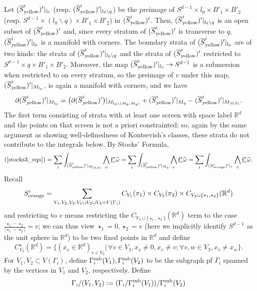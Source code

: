\documentclass[11pt]{article}
\theoremstyle{definition}
\theoremstyle{remark}
\def\wt#1{\widetilde{#1}}
\def\ov#1{\overline{#1}}
\def\syellow{{\textnormal{yellow}}}
\def\sorange{{\textnormal{orange}}}
\def\R{\mathbb{R}}
\def\ff{\mathfrak{f}}
\def\tn#1{\textnormal{#1}}
\begin{document}
Let $(\ov{S}_{\syellow}^i)'|_{l_0}$ (resp. $(\ov{S}_{\syellow}^i)'|_{l_0\backslash q}$) be the preimage of $S^{d-1}\times l_0\times B'_1\times B'_2$ (resp. $S^{d-1}\times (l_0\backslash q)\times B'_1\times B'_2$) in $(\ov{S}_{\syellow}^i)'$. 
Then, $(\ov{S}_{\syellow}^i)'|_{l_0\backslash q}$ is an open subset of $(\ov{S}_{\syellow}^i)'$ and, since every stratum of $(\ov{S}_{\syellow}^i)'$ is transverse to $q$, $(\ov{S}_{\syellow}^i)'|_{l_0}$ is a manifold with corners. 
The boundary strata of $(\ov{S}_{\syellow}^i)'|_{l_0}$ are of two kinds:
the strata of $(\ov{S}_{\syellow}^i)'|_{l_0\backslash q}$ and the strata of $(\ov{S}_{\syellow}^i)'$ restricted to $S^{d-1}\times q\times B'_1\times B'_2$. 
Moreover, the map $(\ov{S}_{\syellow}^i)'|_{l_0}\to S^{d-1}$ is a submersion when restricted to on every stratum, so the preimage of $v$ under this map, $(\ov{S}_{\syellow}^i)'|_{M_{l_0}}$, is again a manifold with corners, and we have 
$$\partial (\ov{S}_{\syellow}^i)'|_{M_{l_0}}=\big(\partial(\ov{S}_{\syellow}^i)'\big)|_{{M}_{l_0\backslash({M}_p,M_q)}}+(\ov{S}_{\syellow}^i)'|_{M_q}-(\ov{S}_{\syellow}^i)'|_{M_{(0,0)}}.$$
The first term consisting of strata with at least one screen with space label $\R^d$ and the points on that screen is not a priori constrainted; so, again by the same argument as showing well-definedness of Kontsevish's classes, these strata do not contribute to the integrals below. 
By Stocks' Formula, 
\begin{equation}\label{stocks4_eqn}
(\ref{stocks3_eqn})=\sum_i\int_{(\ov{S}_{\syellow}^i)'|_{M_{(0,0)}}}\bigwedge_e\ff_e^*\wt\omega=
\sum_i\int_{(\ov{S}_{\syellow}^i)'|_{M_q}}\bigwedge_e\ff_e^*\wt\omega=\sum_i\int_{({S}_{\sorange}^i)'|_v}\bigwedge_e\ff_e^*\wt\omega.
\end{equation}
Recall 
$$S_{\sorange}^i=
\sum_{V_1,V_2,V_3:V_1\sqcup V_2\sqcup V_3=V(\Gamma_i)}
{C}_{V_1}(\pi_1)\times{C}_{V_2}(\pi_2)\times C_{V_3\sqcup\{\star_1,\star_2\}}(\R^d)$$
and restricting to $v$ means restricting the $C_{V_3\sqcup\{\star_1,\star_2\}}(\R^d)$ term to the case $\frac{\star_1-\star_2}{|\star_1-\star_2|}=v$; 
we can thus view $\star_1=0, \star_2=v$ (here we implicitly identify $S^{d-1}$ as the unit sphere in $\R^d$) to be two fixed points in $\R^d$ and define 
$$C^{\star}_{V_3}(\R^d)=\{(x_v\in\R^d)_{v\in V_3}|\,\forall v\in V_3,x_v\neq0,x_v\neq v;\forall v,w\in V_3,x_v\neq x_w\}.$$
For $V_1,V_2\subset V(\Gamma_i)$, define $\Gamma^{\tn{sub}}_i(V_1),\Gamma^{\tn{sub}}_i(V_2)$ to be the subgraph pf $\Gamma_i$ spanned by the vertices in $V_1$ and $V_2$, respectively.
Define
$$\Gamma_i/(V_1,V_2):=(\Gamma_i/\Gamma^{\tn{sub}}_i(V_1))/\Gamma^{\tn{sub}}_i(V_2)$$
\end{document}
